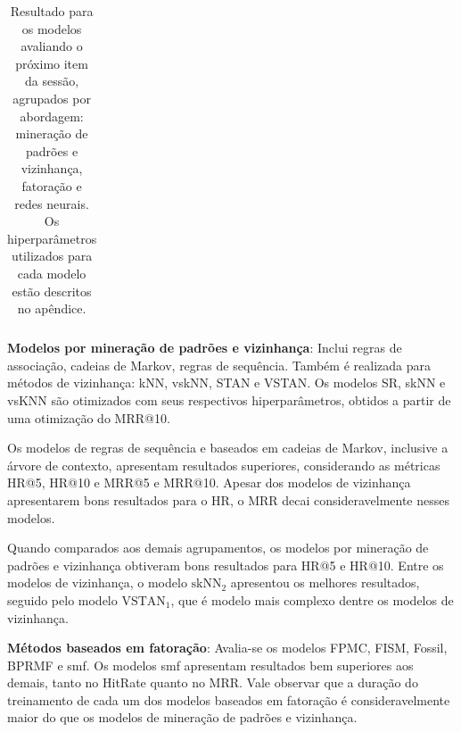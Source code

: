 \begin{table}[htbp]
\begin{tabular}{|l|l|l|l|l|l|l|r|}
      \end{tabular}
  \caption{Resultado para os modelos avaliando o próximo item da sessão, agrupados por
  abordagem: mineração de padrões e vizinhança, fatoração e redes neurais.
  Os hiperparâmetros utilizados para cada modelo estão descritos no apêndice.}
  \label{tab_baseline}  
\end{table}

\textbf{Modelos por mineração de padrões e vizinhança}: Inclui regras de associação, cadeias de Markov, regras de
sequência. Também é realizada para métodos de vizinhança: kNN, vskNN, STAN e
VSTAN. Os modelos SR, skNN e vsKNN são otimizados com seus respectivos
hiperparâmetros, obtidos a partir de uma otimização do MRR@10.

Os modelos de regras de sequência e baseados em cadeias de Markov, inclusive a
árvore de contexto, apresentam resultados superiores, considerando as métricas
HR@5, HR@10 e MRR@5 e MRR@10. Apesar dos modelos de vizinhança apresentarem
bons resultados para o HR, o MRR decai consideravelmente nesses modelos.

Quando comparados aos demais agrupamentos, os modelos por mineração de padrões e
vizinhança obtiveram bons resultados para HR@5 e HR@10. Entre os modelos de
vizinhança, o modelo $\text{skNN}_2$ apresentou os melhores resultados, seguido pelo
modelo $\text{VSTAN}_1$, que é modelo mais complexo dentre os modelos de vizinhança.

\textbf{Métodos baseados em fatoração}: Avalia-se os modelos FPMC, FISM, Fossil,
BPRMF e smf. Os modelos smf apresentam resultados bem superiores aos demais, tanto no HitRate
quanto no MRR. Vale observar que a duração do treinamento de cada um dos modelos
baseados em fatoração é consideravelmente maior do que os modelos de mineração
de padrões e vizinhança.

